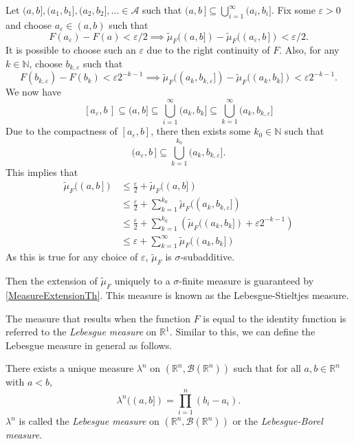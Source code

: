 \vspace{1mm}
Let $(a,b],(a_1,b_1],(a_2,b_2],\ldots\in\mathcal{A}$ such that $(a,b\,]\subseteq\bigcup_{i=1}^\infty (a_i, b_i]$. Fix some $\varepsilon>0$ and choose $a_\varepsilon\in(a,b)$ such that
$$F(a_\varepsilon)-F(a)< \varepsilon/2\implies \tilde\mu_F((a,b]) - \tilde\mu_F((a_\varepsilon,b\,]) < \varepsilon/2.$$
It is possible to choose such an $\varepsilon$ due to the right continuity of $F$. Also, for any $k\in\mathbb{N}$, choose $b_{k, \varepsilon}$ such that $$F(b_{k,\varepsilon})-F(b_k)<\varepsilon 2^{-k-1}\implies \tilde\mu_F((a_k,b_{k,\varepsilon}]) - \tilde\mu_F((a_k,b_k]) < \varepsilon 2^{-k-1}.$$
We now have
$$[a_\varepsilon, b\,]\subseteq (a,b]\subseteq \bigcup_{i=1}^\infty (a_k,b_k]\subseteq \bigcup_{k=1}^\infty (a_k,b_{k,\varepsilon}]$$
Due to the compactness of $[a_\varepsilon,b]$, there then exists some $k_0\in\mathbb{N}$ such that
$$(a_{\varepsilon},b\,]\subseteq\bigcup_{k=1}^{k_0}(a_k,b_{k,\varepsilon}].$$
This implies that
\begin{align*}
    \tilde\mu_F((a,b\,]) &\leq \frac{\varepsilon}{2} + \tilde\mu_F((a,b]) \\
    &\leq \frac{\varepsilon}{2} + \sum_{k=1}^{k_0} \tilde\mu_F((a_k,b_{k,\varepsilon}]) \\
    &\leq \frac{\varepsilon}{2} + \sum_{k=1}^{k_0} \left(\tilde\mu_F((a_k,b_k]) + \varepsilon2^{-k-1}\right) \\
    &\leq \varepsilon + \sum_{k=1}^{\infty} \tilde\mu_F((a_k,b_k])
\end{align*}
As this is true for any choice of $\varepsilon$, $\tilde\mu_F$ is $\sigma$-subadditive.

\vspace{2mm}
Then the extension of $\tilde\mu_F$ uniquely to a $\sigma$-finite measure is guaranteed by \ref{MeasureExtensionTh}. This measure is known as the Lebesgue-Stieltjes measure.

\vspace{2mm}
The measure that results when the function $F$ is equal to the identity function is referred to the \textit{Lebesgue measure} on $\mathbb{R}^1$. Similar to this, we can define the Lebesgue measure in general as follows.

\begin{definition}
    There exists a unique measure $\lambda^n$ on $(\mathbb{R}^n,\mathcal{B}(\mathbb{R}^n))$ such that for all $a,b\in\mathbb{R}^n$ with $a<b$,
    $$\lambda^n((a,b])=\prod_{i=1}^n (b_i-a_i).$$
    $\lambda^n$ is called the \textit{Lebesgue measure} on $(\mathbb{R}^n, \mathcal{B}(\mathbb{R}^n))$ or the \textit{Lebesgue-Borel measure}.
\end{definition}

